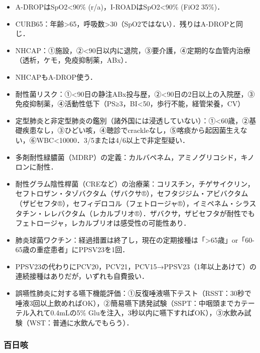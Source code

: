 \begin{itemize}
\item A-DROPはSpO2<90\% (r/a)，I-ROADはSpO2<90\% (FiO2 35\%)．
\item CURB65：年齢>65，呼吸数>30（SpO2ではない）．残りはA-DROPと同じ．
\item NHCAP：①施設，②<90日以内に退院，③要介護，④定期的な血管内治療（透析，ケモ，免疫抑制薬，ABx）．
\item NHCAPもA-DROP使う．
\item 耐性菌リスク：①<90日の静注ABx投与歴，②<90日の2日以上の入院歴，③免疫抑制薬，④活動性低下（PS≥3，BI<50，歩行不能，経管栄養，CV）


\item 定型肺炎と非定型肺炎の鑑別（諸外国には浸透していない）：①<60歳，②基礎疾患なし，③ひどい咳，④聴診でcrackleなし，⑤喀痰から起因菌生えない，⑥WBC<10000．3/5または4/6以上で非定型疑い．
\item 多剤耐性緑膿菌（MDRP）の定義：カルバペネム，アミノグリコシド，キノロンに耐性．
\item 耐性グラム陰性桿菌（CREなど）の治療薬：コリスチン，チゲサイクリン，セフトロザン・タゾバクタム（ザバクサ®），セフタジジム・アビバクタム（ザビセフタ®），セフィデロコル（フェトロージャ®），イミペネム・シラスタチン・レレバクタム（レカルブリオ®）．ザバクサ，ザビセフタが耐性でもフェトロージャ，レカルブリオは感受性の可能性あり．
\item 肺炎球菌ワクチン：経過措置は終了し，現在の定期接種は「>65歳」or「60-65歳の重症患者」にPPSV23を1回．
\item PPSV23の代わりにPCV20，PCV21，PCV15→PPSV23（1年以上あけて）の連続接種はありだが，いずれも自費扱い．


\item 誤嚥性肺炎に対する嚥下機能評価：①反復唾液嚥下テスト（RSST：30秒で唾液3回以上飲めればOK），②簡易嚥下誘発試験（SSPT：中咽頭までカテーテル入れて0.4mLの5\% Gluを注入，3秒以内に嚥下すればOK），③水飲み試験（WST：普通に水飲んでもらう）．
\end{itemize}


\subsubsection{百日咳}

